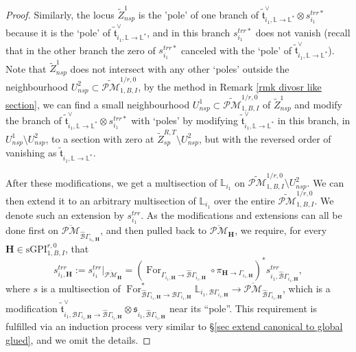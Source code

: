 \documentclass[11pt]{amsart}
\theoremstyle{definition}
\theoremstyle{remark}
\newcommand{\oPMb}{{\overline{\mathcal{PM}}}}
\newcommand{\nontilde}{}
\newcommand{\<}{\left<}
\renewcommand{\>}{\right>}
\numberwithin{equation}{section}
\def\sGPI{\text{sGPI}}
\begin{document}
\begin{proof}
         Similarly, the locus $\widetilde{Z}^{1}_{nsp}$ is the 'pole' of one branch of $\tilde{\mathfrak{t}}^{\vee}_{i_1,\mathbb L \to \mathbb L^*}\otimes \nontilde{s}^{trr*}_{i_1}$ because it is the `pole' of $\tilde{\mathfrak{t}}^{\vee}_{i_1,\mathbb L \to \mathbb L^*}$, and in this branch $\nontilde{s}^{trr*}_{i_1}$ does not vanish (recall that in the other branch the zero of $\nontilde{s}^{trr*}_{i_1}$ canceled with the `pole' of $\tilde{\mathfrak{t}}^{\vee}_{i_1,\mathbb L \to \mathbb L^*}$). 
         Note that $\widetilde{Z}^{1}_{nsp}$ does not intersect with any %
other `poles' outside %
the neighbourhood $U^2_{nsp}\subset \widetilde{\mathcal{PM}}^{1/r,0}_{1,B,I}$,  by the method in Remark \ref{rmk divosr like section}, we can find a small neighbourhood $U^{1}_{nsp}\subset \widetilde{\mathcal{PM}}^{1/r,0}_{1,B,I}$ of $\widetilde{Z}^{1}_{nsp}$ and modify the branch of $\tilde{\mathfrak{t}}^{\vee}_{i_1,\mathbb L \to \mathbb L^*}\otimes \nontilde{s}^{trr*}_{i_1}$ with `poles' by modifying $\tilde{\mathfrak{t}}^{\vee}_{i_1,\mathbb L \to \mathbb L^*}$ in this branch, in $U^{1}_{nsp}\setminus U^{2}_{nsp}$, to a section with zero at $\widetilde{Z}^{R,T}_{sp}\setminus U^{2}_{nsp}$, but with the reversed order of vanishing as $\tilde{\mathfrak{t}}_{i_1,\mathbb L \to \mathbb L^*}$.

         After these modifications, we get a multisection of $\mathbb L_{i_1}$ on $\widetilde{\mathcal{PM}}^{1/r,0}_{1,B,I}\setminus U^{2}_{nsp}$. We can then extend it to an arbitrary multisection of $\mathbb L_{i_1}$ over the entire  $\widetilde{\mathcal{PM}}^{1/r,0}_{1,B,I}$.   We denote such an extension by $s_{i_1}^{trr}$. 
         As the modifications and extensions can all be done first on $\oPMb_{\hat{\mathcal{B}}\Gamma_{i_1,\bm{H}}}$, and then pulled back to  $\oPMb_{\bm{H}}$, we require, for every $\bm{H}\in \sGPI_{1,B,I}^{r,0}$, that 
         $$s_{i_1,\bm{H}}^{trr}:=s_{i_1}^{trr}\vert_{\oPMb_{\bm{H}}}=\left(\operatorname{For}_{\Gamma_{i_1,\bm{H}} \to \hat{\mathcal B}\Gamma_{i_1,\bm{H}}}\circ\pi_{\bm{H}\to \Gamma_{i_1,\bm{H}}}\right)^* s_{i_1,\hat{\mathcal B}\Gamma_{i_1,\bm{H}}}^{trr},$$
             where $s$ is a multisection of $\operatorname{For}^*_{\hat{\mathcal B}\Gamma_{i_1,\bm{H}} \to {\mathcal B}\Gamma_{i_1,\bm{H}}}\mathbb L_{i_1,{\mathcal B}\Gamma_{i_1,\bm{H}}}\to \oPMb_{\hat{\mathcal{B}}\Gamma_{i_1,\bm{H}}}$, which is a modification $        \tilde{\mathfrak t}^\vee_{i_1,{\mathcal B}\Gamma_{i_1,\bm{H}}\to\hat{\mathcal B}\Gamma_{i_1,\bm{H}}}\otimes \mathfrak s_{i_1,\hat{\mathcal B}\Gamma_{i_1,\bm{H}}}$ near its ``pole''.  
             This requirement is fulfilled via an induction process very similar to \S \ref{sec extend canonical to global glued}, and we omit the details. 
        

\end{proof}
\end{document}
